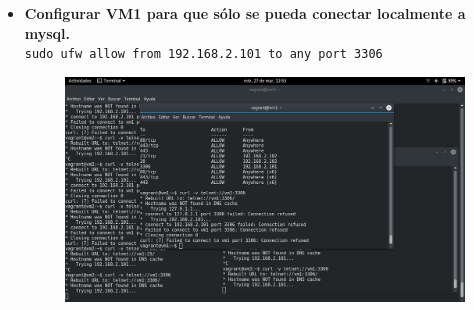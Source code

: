 \documentclass[12pt,letterpaper]{article}
\begin{document}
\begin{itemize}
\begin{figure}[h]
	\end{figure}
	\newpage
	\item \textbf{Configurar VM1 para que sólo se pueda conectar localmente a mysql.} \\
	\texttt{sudo ufw allow from 192.168.2.101 to any port 3306}
	\begin{figure}[h]
		\centering
		\includegraphics[scale=0.34]{mysql2.png}
	\end{figure}
\end{itemize}
\end{document}
